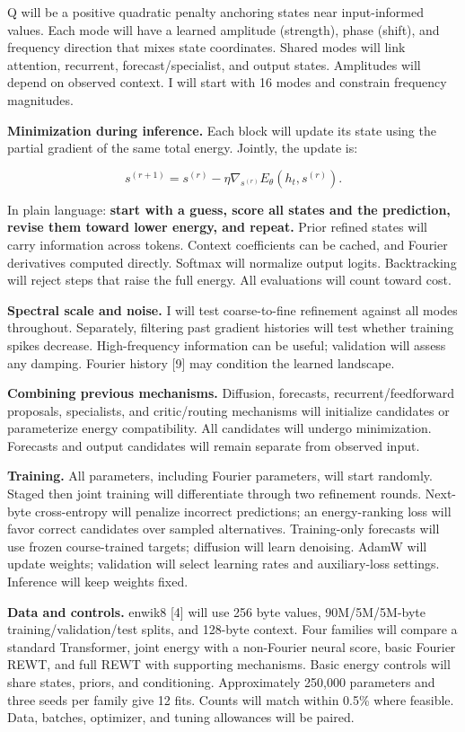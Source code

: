 \documentclass[11pt,letterpaper]{article}
\begin{document}
Q will be a positive quadratic penalty anchoring states near input-informed values. Each mode will have a learned amplitude (strength), phase (shift), and frequency direction that mixes state coordinates. Shared modes will link attention, recurrent, forecast/specialist, and output states. Amplitudes will depend on observed context. I will start with 16 modes and constrain frequency magnitudes.

\textbf{Minimization during inference.} Each block will update its state using the partial gradient of the same total energy. Jointly, the update is:

\[
s^{(r+1)}=s^{(r)}-\eta\nabla_{s^{(r)}}E_\theta(h_t,s^{(r)}).
\]

In plain language: \textbf{start with a guess, score all states and the prediction, revise them toward lower energy, and repeat.} Prior refined states will carry information across tokens. Context coefficients can be cached, and Fourier derivatives computed directly. Softmax will normalize output logits. Backtracking will reject steps that raise the full energy. All evaluations will count toward cost.

\textbf{Spectral scale and noise.} I will test coarse-to-fine refinement against all modes throughout. Separately, filtering past gradient histories will test whether training spikes decrease. High-frequency information can be useful; validation will assess any damping. Fourier history [9] may condition the learned landscape.

\textbf{Combining previous mechanisms.} Diffusion, forecasts, recurrent/feedforward proposals, specialists, and critic/routing mechanisms will initialize candidates or parameterize energy compatibility. All candidates will undergo minimization. Forecasts and output candidates will remain separate from observed input.

\textbf{Training.} All parameters, including Fourier parameters, will start randomly. Staged then joint training will differentiate through two refinement rounds. Next-byte cross-entropy will penalize incorrect predictions; an energy-ranking loss will favor correct candidates over sampled alternatives. Training-only forecasts will use frozen course-trained targets; diffusion will learn denoising. AdamW will update weights; validation will select learning rates and auxiliary-loss settings. Inference will keep weights fixed.

\textbf{Data and controls.} enwik8 [4] will use 256 byte values, 90M/5M/5M-byte training/validation/test splits, and 128-byte context. Four families will compare a standard Transformer, joint energy with a non-Fourier neural score, basic Fourier REWT, and full REWT with supporting mechanisms. Basic energy controls will share states, priors, and conditioning. Approximately 250,000 parameters and three seeds per family give 12 fits. Counts will match within 0.5\% where feasible. Data, batches, optimizer, and tuning allowances will be paired.
\end{document}
